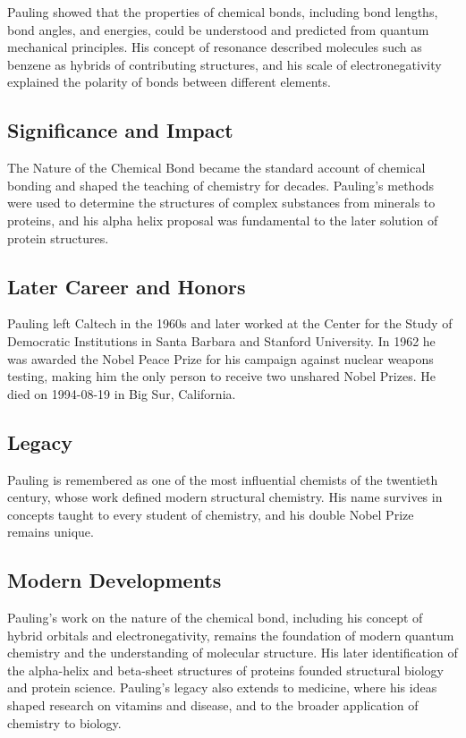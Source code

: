 Pauling showed that the properties of chemical bonds, including bond lengths, bond angles, and energies, could be understood and predicted from quantum mechanical principles. His concept of resonance described molecules such as benzene as hybrids of contributing structures, and his scale of electronegativity explained the polarity of bonds between different elements.

\subsection*{Significance and Impact}

The Nature of the Chemical Bond became the standard account of chemical bonding and shaped the teaching of chemistry for decades. Pauling's methods were used to determine the structures of complex substances from minerals to proteins, and his alpha helix proposal was fundamental to the later solution of protein structures.

\subsection*{Later Career and Honors}

Pauling left Caltech in the 1960s and later worked at the Center for the Study of Democratic Institutions in Santa Barbara and Stanford University. In 1962 he was awarded the Nobel Peace Prize for his campaign against nuclear weapons testing, making him the only person to receive two unshared Nobel Prizes. He died on 1994-08-19 in Big Sur, California.

\subsection*{Legacy}

Pauling is remembered as one of the most influential chemists of the twentieth century, whose work defined modern structural chemistry. His name survives in concepts taught to every student of chemistry, and his double Nobel Prize remains unique.

\subsection*{Modern Developments}

Pauling's work on the nature of the chemical bond, including his concept of hybrid orbitals and electronegativity, remains the foundation of modern quantum chemistry and the understanding of molecular structure. His later identification of the alpha-helix and beta-sheet structures of proteins founded structural biology and protein science. Pauling's legacy also extends to medicine, where his ideas shaped research on vitamins and disease, and to the broader application of chemistry to biology.

